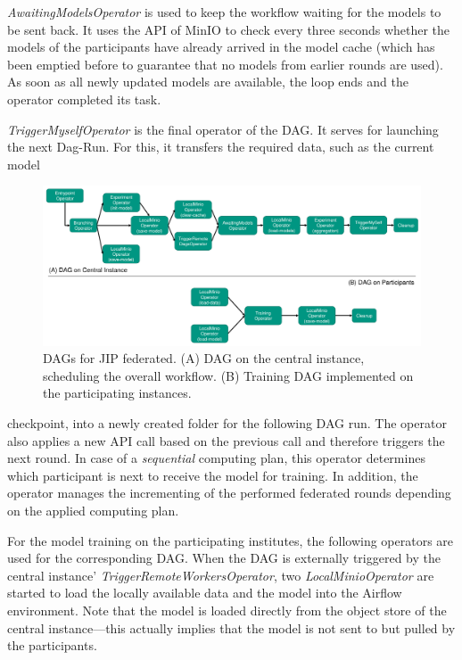 \textit{AwaitingModelsOperator} is used to keep the workflow waiting for the models to be sent back. It uses the API of MinIO to check every three seconds whether the models of the participants have already arrived in the model cache (which has been emptied before to guarantee that no models from earlier rounds are used). As soon as all newly updated models are available, the loop ends and the operator completed its task.

\textit{TriggerMyselfOperator} is the final operator of the DAG.
It serves for launching the next Dag-Run. For this, it transfers the required data, such as the current model

\begin{figure}
    \centerline{\includegraphics[width=1\textwidth]{1_Figures/DAG_KaapanaFed.pdf}}
    \caption[Detailed illustration of DAGs for JIP Federated]{DAGs for JIP federated. (A) DAG on the central instance, scheduling the overall workflow. (B) Training DAG implemented on the participating instances.}
\label{fig:DetailedDAG_KaapanaFed}
\end{figure}

checkpoint, into a newly created folder for the following DAG run. The operator also applies a new API call based on the previous call and therefore triggers the next round. In case of a \textit{sequential} computing plan, this operator determines which participant is next to receive the model for training. In addition, the operator manages the incrementing of the performed federated rounds depending on the applied computing plan.

For the model training on the participating institutes, the following operators are used for the corresponding DAG.
When the DAG is externally triggered by the central instance' \textit{TriggerRemoteWorkersOperator}, two \textit{LocalMinioOperator} are started to load the locally available data and the model into the Airflow environment. Note that the model is loaded directly from the object store of the central instance---this actually implies that the model is not sent to but pulled by the participants.

